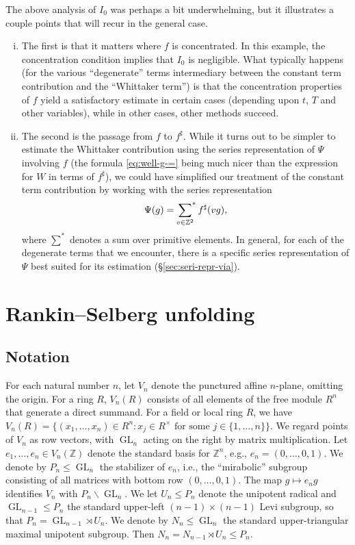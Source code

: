 \documentclass[reqno]{amsart}
\DeclareMathOperator{\GL}{GL}
\theoremstyle{plain} \newtheorem{theorem} {Theorem}
\theoremstyle{definition} \newtheorem{definition} [theorem] {Definition}
\theoremstyle{itplain} %
\numberwithin{equation}{section}
\numberwithin{theorem}{section}
\renewcommand{\leq}{\leqslant}
\begin{document}
The above analysis of $I_0$ was perhaps a bit underwhelming, but it illustrates a couple points that will recur in the general case.
\begin{enumerate}[(i)]
\item The first is that it matters where $f$ is concentrated.  In this example, the concentration condition implies that $I_0$ is negligible.  What typically happens (for the various ``degenerate'' terms intermediary between the constant term contribution and the ``Whittaker term'') is that the concentration properties of $f$ yield a satisfactory estimate in certain cases (depending upon $t$, $T$ and other variables), while in other cases, other methods succeed.
\item The second is the passage from $f$ to $f ^\sharp$.  While it turns out to be simpler to estimate the Whittaker contribution using the series representation of $\Psi$ involving $f$ (the formula \eqref{eq:well-g-=} being much nicer than the expression for $W$ in terms of $f ^\sharp$), we could have simplified our treatment of the constant term contribution by working with the series representation
  \begin{equation*}
    \Psi(g) =
    \sideset{}{^*}\sum _{v \in \mathbb{Z}^2} f ^\sharp (v g),
  \end{equation*}
  where $\sum^\ast$ denotes a sum over primitive elements.  In general, for each of the degenerate terms that we encounter, there is a specific series representation of $\Psi$ best suited for its estimation (\S\ref{sec:seri-repr-via}).
\end{enumerate}






\section{Rankin--Selberg unfolding}\label{sec:rank-selb-unfold}

\subsection{Notation}\label{sec:notation-rs-unfolding}
For each natural number $n$, let $V_n$ denote the punctured affine $n$-plane, omitting the origin.  For a ring $R$, $V_n(R)$ consists of all elements of the free module $R^n$ that generate a direct summand.  For a field or local ring $R$, we have $V_n(R) = \{(x_1,\dotsc,x_n) \in R^n : x_j \in R^\times \text{ for some } j \in \{1,\dotsc,n\}\}$.  We regard points of $V_n$ as row vectors, with $\GL_n$ acting on the right by matrix multiplication.  Let $e_1,\dotsc,e_n \in V_n(\mathbb{Z})$ denote the standard basis for $\mathbb{Z}^n$, e.g., $e_n = (0,\dotsc,0,1)$.  We denote by $P_n \leq \GL_n$ the stabilizer of $e_n$, i.e., the ``mirabolic'' subgroup consisting of all matrices with bottom row $(0,\dotsc,0,1)$.  The map $g \mapsto e_n g$ identifies $V_n$ with $P_n \backslash \GL_n$.  We let $U_n \leq P_n$ denote the unipotent radical and $\GL_{n-1} \leq P_n$ the standard upper-left $(n-1) \times (n-1)$ Levi subgroup, so that $P_n = \GL_{n-1} \rtimes U_n$.  We denote by $N_n \leq \GL_n$ the standard upper-triangular maximal unipotent subgroup.  Then $N_n = N_{n-1} \rtimes U_n \leq P_n$.
\end{document}
